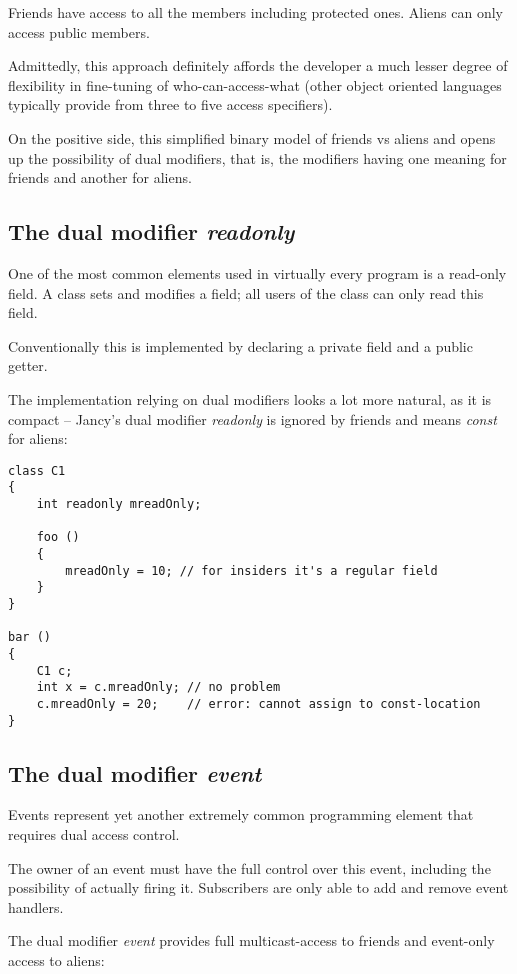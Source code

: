 \documentclass[oneside]{book}
\begin{document}
Friends have access to all the members including protected ones. Aliens can only access public members.

Admittedly, this approach definitely affords the developer a much lesser degree of flexibility in fine-tuning of who-can-access-what (other object oriented languages typically provide from three to five access specifiers).

On the positive side, this simplified binary model of friends vs aliens and opens up the possibility of dual modifiers, that is, the modifiers having one meaning for friends and another for aliens.

\subsection{The dual modifier \emph{readonly}}
One of the most common elements used in virtually every program is a read-only field. A class sets and modifies a field; all users of the class can only read this field.

Conventionally this is implemented by declaring a private field and a public getter.

The implementation relying on dual modifiers looks a lot more natural, as it is compact -- Jancy's dual modifier \emph{readonly} is ignored by friends and means \emph{const} for aliens:

\begin{lstlisting}
class C1
{
    int readonly mreadOnly;

    foo ()
    {
        mreadOnly = 10; // for insiders it's a regular field
    }
}

bar ()
{
    C1 c;
    int x = c.mreadOnly; // no problem
    c.mreadOnly = 20;    // error: cannot assign to const-location
}
\end{lstlisting}

\subsection{The dual modifier \emph{event}}
Events represent yet another extremely common programming element that requires dual access control.

The owner of an event must have the full control over this event, including the possibility of actually firing it. Subscribers are only able to add and remove event handlers.

The dual modifier \emph{event} provides full multicast-access to friends and event-only access to aliens:
\end{document}
